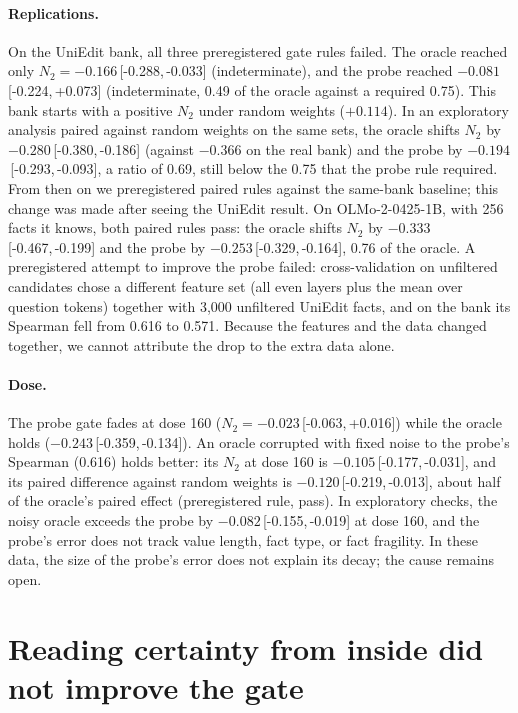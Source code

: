 \documentclass[11pt]{article}
\newcommand{\NTwo}{\ensuremath{N_2}}
\newcommand{\ci}[2]{\,[#1,\,#2]}
\begin{document}
\paragraph{Replications.}
On the UniEdit bank, all three preregistered gate rules failed.
The oracle reached only $\NTwo=-0.166$\ci{-0.288}{-0.033} (indeterminate), and the probe reached $-0.081$\ci{-0.224}{+0.073} (indeterminate, 0.49 of the oracle against a required 0.75).
This bank starts with a positive \NTwo{} under random weights ($+0.114$).
In an exploratory analysis paired against random weights on the same sets, the oracle shifts \NTwo{} by $-0.280$\ci{-0.380}{-0.186} (against $-0.366$ on the real bank) and the probe by $-0.194$\ci{-0.293}{-0.093}, a ratio of 0.69, still below the 0.75 that the probe rule required.
From then on we preregistered paired rules against the same-bank baseline; this change was made after seeing the UniEdit result.
On OLMo-2-0425-1B, with 256 facts it knows, both paired rules pass: the oracle shifts \NTwo{} by $-0.333$\ci{-0.467}{-0.199} and the probe by $-0.253$\ci{-0.329}{-0.164}, 0.76 of the oracle.
A preregistered attempt to improve the probe failed: cross-validation on unfiltered candidates chose a different feature set (all even layers plus the mean over question tokens) together with 3{,}000 unfiltered UniEdit facts, and on the bank its Spearman fell from 0.616 to 0.571. Because the features and the data changed together, we cannot attribute the drop to the extra data alone.

\paragraph{Dose.}
The probe gate fades at dose 160 ($\NTwo=-0.023$\ci{-0.063}{+0.016}) while the oracle holds ($-0.243$\ci{-0.359}{-0.134}).
An oracle corrupted with fixed noise to the probe's Spearman (0.616) holds better: its \NTwo{} at dose 160 is $-0.105$\ci{-0.177}{-0.031}, and its paired difference against random weights is $-0.120$\ci{-0.219}{-0.013}, about half of the oracle's paired effect (preregistered rule, pass).
In exploratory checks, the noisy oracle exceeds the probe by $-0.082$\ci{-0.155}{-0.019} at dose 160, and the probe's error does not track value length, fact type, or fact fragility.
In these data, the size of the probe's error does not explain its decay; the cause remains open.

\section{Reading certainty from inside did not improve the gate}
\label{sec:observer}
\end{document}
